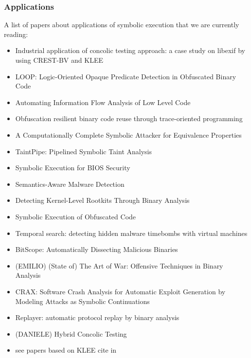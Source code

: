 \documentclass[10pt, a4paper]{article}
\begin{document}
\subsubsection{Applications}
A list of papers about applications of symbolic execution that we are currently reading:
\begin{itemize}
  \item \cite{KKK-ICSE12} Industrial application of concolic testing approach: a case study on libexif by using CREST-BV and KLEE
  \item \cite{LOOP-CCS15} LOOP: Logic-Oriented Opaque Predicate Detection in Obfuscated Binary Code
  \item \cite{BDG-CCS14} Automating Information Flow Analysis of Low Level Code
  \item \cite{ZFM-CCS13} Obfuscation resilient binary code reuse through trace-oriented programming
  \item \cite{BC-CCS14} A Computationally Complete Symbolic Attacker for Equivalence Properties
  \item \cite{MWX-USEC15} TaintPipe: Pipelined Symbolic Taint Analysis
  \item \cite{BLR-WOOT15} Symbolic Execution for {BIOS} Security
  \item \cite{CJS-SP05} Semantics-Aware Malware Detection
  \item \cite{KRV-ACSAC04} Detecting Kernel-Level Rootkits Through Binary Analysis
  \item \cite{YD-CCS15} Symbolic Execution of Obfuscated Code
  \item \cite{CWO-ASPLOS06} Temporal search: detecting hidden malware timebombs with virtual machines
  \item \cite{BHK-TR07} BitScope: Automatically Dissecting Malicious Binaries
  \item (EMILIO) \cite{ANGR-SP16} (State of) The Art of War: Offensive Techniques in Binary Analysis
  \item \cite{CRAX-SERE12} CRAX: Software Crash Analysis for Automatic Exploit Generation by Modeling Attacks as Symbolic Continuations
  \item \cite{REPLAYER-CCS06} Replayer: automatic protocol replay by binary analysis
  \item (DANIELE) \cite{RK-ICSE07} Hybrid Concolic Testing
  \item see papers based on KLEE cite in~\cite{RED-ICSE16} 
\end{itemize}
\end{document}

